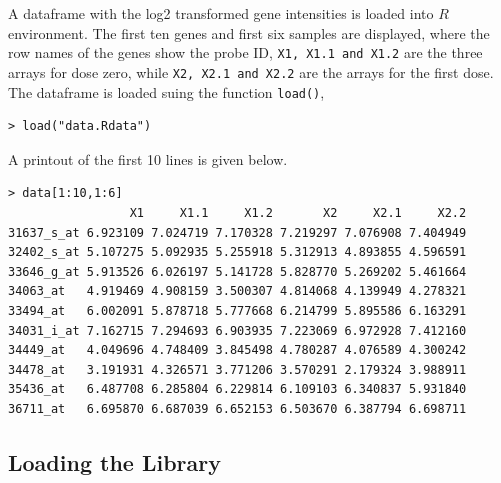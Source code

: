A dataframe with the log2 transformed gene intensities is loaded
into $R$ environment. The first ten genes and first six samples are
displayed, where the row names of the genes show the probe ID,
\texttt{X1, X1.1 and X1.2} are the three arrays for dose zero, while
\texttt{X2, X2.1 and X2.2} are the arrays for the first dose. The dataframe is loaded suing the function \texttt{load()},
\begin{center}
\begin{boxit}
\begin{verbatim}
> load("data.Rdata")
\end{verbatim}
\end{boxit}
\end{center}
A printout of the first 10 lines is given below.
\begin{center}
\begin{boxit}
\begin{verbatim}
> data[1:10,1:6]
                 X1     X1.1     X1.2       X2     X2.1     X2.2
31637_s_at 6.923109 7.024719 7.170328 7.219297 7.076908 7.404949
32402_s_at 5.107275 5.092935 5.255918 5.312913 4.893855 4.596591
33646_g_at 5.913526 6.026197 5.141728 5.828770 5.269202 5.461664
34063_at   4.919469 4.908159 3.500307 4.814068 4.139949 4.278321
33494_at   6.002091 5.878718 5.777668 6.214799 5.895586 6.163291
34031_i_at 7.162715 7.294693 6.903935 7.223069 6.972928 7.412160
34449_at   4.049696 4.748409 3.845498 4.780287 4.076589 4.300242
34478_at   3.191931 4.326571 3.771206 3.570291 2.179324 3.988911
35436_at   6.487708 6.285804 6.229814 6.109103 6.340837 5.931840
36711_at   6.695870 6.687039 6.652153 6.503670 6.387794 6.698711
\end{verbatim}
\end{boxit}
\end{center}

\subsection{Loading the Library}

